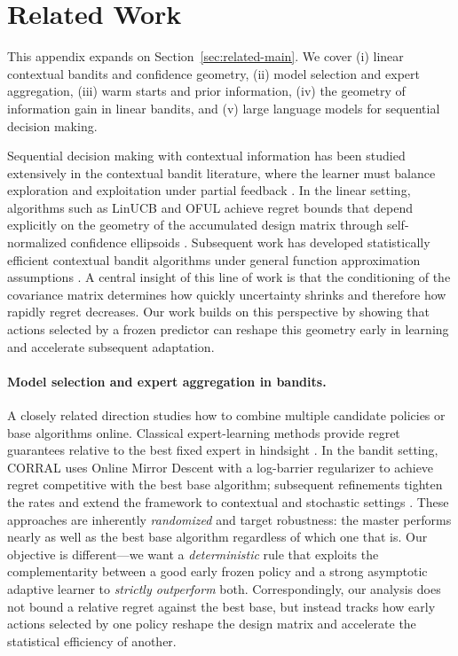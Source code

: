 \documentclass[anon]{alt2027} %
\begin{document}
\section{Related Work}\label{sec:related}
This appendix expands on Section~\ref{sec:related-main}. We cover (i) linear contextual bandits and confidence geometry,
(ii) model selection and expert aggregation, (iii) warm starts and prior
information, (iv) the geometry of information gain in linear bandits, and
(v) large language models for sequential decision making.

Sequential decision making with contextual information has been studied
extensively in the contextual bandit literature, where the learner must
balance exploration and exploitation under partial feedback
\citep{langford2007epoch,agarwal2014taming,foster2021statistical,
lattimore2020bandit}. In the linear setting, algorithms such as LinUCB and
OFUL achieve regret bounds that depend explicitly on the geometry of the
accumulated design matrix through self-normalized confidence ellipsoids
\citep{chu2011contextual,abbasi2011improved}. Subsequent work has developed
statistically efficient contextual bandit algorithms under general function
approximation assumptions \citep{agarwal2012contextual,foster2018practical,
foster2020beyond,simchi2022bypassing,zhu2022contextual,rucker2023infinite,
zhang2024efficient}. A central insight of this line of work is that the
conditioning of the covariance matrix determines how quickly uncertainty
shrinks and therefore how rapidly regret decreases. Our work builds on this
perspective by showing that actions selected by a frozen predictor can
reshape this geometry early in learning and accelerate subsequent adaptation.

\paragraph{Model selection and expert aggregation in bandits.}
A closely related direction studies how to combine multiple candidate
policies or base algorithms online. Classical expert-learning methods provide
regret guarantees relative to the best fixed expert in hindsight
\citep{auer2002nonstochastic}. In the bandit setting, CORRAL
\citep{agarwal2017corralling} uses Online Mirror Descent with a log-barrier
regularizer to achieve regret competitive with the best base algorithm;
subsequent refinements tighten the rates and extend the framework to
contextual and stochastic settings
\citep{pacchiano2020model,marinov2021pareto,zhu2022pareto,zhu2022near,
dann2024data}. These approaches are inherently \emph{randomized} and target
robustness: the master performs nearly as well as the best base algorithm
regardless of which one that is. Our objective is different---we want a
\emph{deterministic} rule that exploits the complementarity between a good
early frozen policy and a strong asymptotic adaptive learner to
\emph{strictly outperform} both. Correspondingly, our analysis does not
bound a relative regret against the best base, but instead tracks how early
actions selected by one policy reshape the design matrix and accelerate the
statistical efficiency of another.
\end{document}
